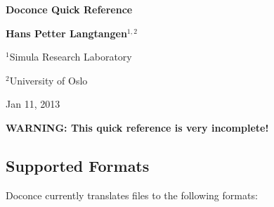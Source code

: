 \documentclass[%
oneside,                 %
final,                   %
10pt]{article}
\begin{document}





\begin{center}
{\LARGE\bf Doconce Quick Reference}
\end{center}





\begin{center}
{\bf Hans Petter Langtangen${}^{1, 2}$} \\ [0mm]
\end{center}

\begin{center}
\centerline{{\small ${}^1$Simula Research Laboratory}}
\centerline{{\small ${}^2$University of Oslo}}
\end{center}





\begin{center}
Jan 11, 2013
\end{center}

\vspace{1cm}



\tableofcontents

\vspace{1cm} %






\textbf{WARNING: This quick reference is very incomplete!}

\subsection{Supported Formats}

Doconce currently translates files to the following formats:
\end{document}

